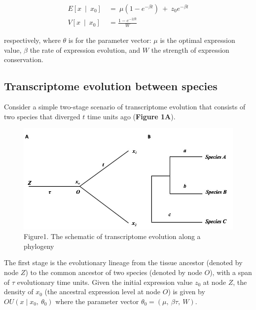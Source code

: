 \documentclass[]{book}
\begin{document}
\[
\begin{split}
E\left[x\  \mid\  x_0\right]\  &=\  \mu\left(1-e^{-\beta t}\right)\  +\  z_0e^{-\beta t} \\
V\left[x\  \mid\  x_0\right]\  &=\frac{1-e^{-2\beta t}}{W}
\end{split}\tag{1.1}
\]

respectively, where \(\theta\) is for the parameter vector: \(\mu\) is the optimal expression value, \(\beta\) the rate of expression evolution, and \(W\) the strength of expression conservation.

\hypertarget{transcriptome-evolution-between-species}{%
\subsection{Transcriptome evolution between species}\label{transcriptome-evolution-between-species}}

Consider a simple two-stage scenario of transcriptome evolution that consists of two species that diverged \(t\) time units ago (\textbf{Figure 1A}).

\begin{figure}
\includegraphics[width=0.9\linewidth]{Figure1} \caption{Figure1. The schematic of transcriptome evolution along a phylogeny}\label{fig:unnamed-chunk-14}
\end{figure}

The first stage is the evolutionary lineage from the tissue ancestor (denoted by node \(Z\)) to the common ancestor of two species (denoted by node \(O\)), with a span of \(\tau\) evolutionary time units. Given the initial expression value \(z_0\) at node \(Z\), the density of \(x_0\) (the ancestral expression level at node \(O\)) is given by \(OU\left(x\mid x_0,\  \theta_0\right)\) where the parameter vector \(\theta_{0}=\left(\mu,\  \beta\tau,\  W\right)\).
\end{document}
